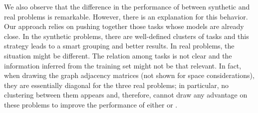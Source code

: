 We also observe that the difference in the performance of  between synthetic and real problems is remarkable.
However, there is an explanation for this behavior. Our  approach relies on pushing together those tasks whose models are already close. In the synthetic problems, there are well-defined clusters of tasks and this strategy leads to a smart grouping and better results. In real problems, the situation might be different. The relation among tasks is not clear and the information inferred from the training set might not be that relevant. 
In fact, when drawing the graph adjacency matrices (not shown for space considerations), they are essentially diagonal for the three real problems; in particular, no clustering between them appears and, therefore,  cannot draw any advantage on these problems to improve the performance of either  or .

